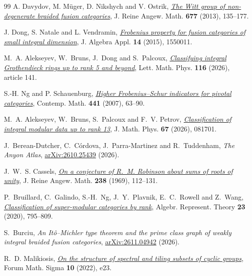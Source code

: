 \documentclass[11pt,a4paper]{article}
\numberwithin{equation}{section}
\theoremstyle{remark}
\begin{document}
\begin{thebibliography}{99}
A. Davydov, M. M\"uger, D. Nikshych and V. Ostrik, \href{https://doi.org/10.1515/crelle.2012.014}{\emph{The Witt group of non-degenerate braided fusion categories}}, J. Reine Angew. Math. \textbf{677} (2013), 135--177.

J. Dong, S. Natale and L. Vendramin, \href{https://doi.org/10.1142/s0219498815500115}{\emph{Frobenius property for fusion categories of small integral dimension}}, J. Algebra Appl. \textbf{14} (2015), 1550011.

M.~A. Alekseyev, W.~Bruns, J.~Dong and S.~Palcoux,
\href{https://doi.org/10.1007/s11005-026-02164-7}{\emph{Classifying integral Grothendieck rings up to rank 5 and beyond}},
Lett. Math. Phys. \textbf{116} (2026), article 141.

S.-H. Ng and P. Schauenburg, \href{https://doi.org/10.1090/conm/441/08500}{\emph{Higher Frobenius--Schur indicators for pivotal categories}}, Contemp. Math. \textbf{441} (2007), 63--90.

M.~A. Alekseyev, W.~Bruns, S.~Palcoux and F.~V. Petrov,
\href{https://doi.org/10.1063/5.0334158}{\emph{Classification of integral modular data up to rank 13}},
J. Math. Phys. \textbf{67} (2026), 081701.

J.~Berean-Dutcher, C.~C\'ordova, J.~Parra-Martinez and R.~Tuddenham,
\emph{The Anyon Atlas}, \href{https://arxiv.org/abs/2610.25439}{arXiv:2610.25439} (2026).

J.~W.~S. Cassels,
\href{https://doi.org/10.1515/crll.1969.238.112}{\emph{On a conjecture of R.~M. Robinson about sums of roots of unity}},
J. Reine Angew. Math. \textbf{238} (1969), 112--131.

P.~Bruillard, C.~Galindo, S.-H.~Ng, J.~Y.~Plavnik, E.~C.~Rowell and Z.~Wang,
\href{https://doi.org/10.1007/s10468-019-09873-9}{\emph{Classification of super-modular categories by rank}},
Algebr. Represent. Theory \textbf{23} (2020), 795--809.

S.~Burciu, \emph{An It\^o--Michler type theorem and the prime class graph of weakly integral braided fusion categories}, \href{https://arxiv.org/abs/2611.04942}{arXiv:2611.04942} (2026).

R.~D. Malikiosis, \href{https://doi.org/10.1017/fms.2022.14}{\emph{On the structure of spectral and tiling subsets of cyclic groups}}, Forum Math. Sigma \textbf{10} (2022), e23.

\end{thebibliography}
\end{document}
